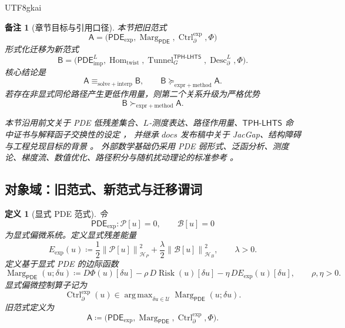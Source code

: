 \documentclass[12pt]{article}
\newtheorem{definition}{定义}[section]
\newtheorem{remark}{备注}[section]
\newcommand{\DefEq}{\coloneqq}
\newcommand{\Pcal}{\mathcal P}
\newcommand{\Bcal}{\mathcal B}
\newcommand{\Ucal}{\mathcal U}
\newcommand{\Hcal}{\mathcal H}
\newcommand{\TPHLHTS}{\ensuremath{\mathsf{TPH\mbox{-}LHTS}}}
\newcommand{\PDE}{\ensuremath{\mathsf{PDE}}}
\newcommand{\norm}[1]{\left\lVert #1 \right\rVert}
\DeclareMathOperator{\Risk}{Risk}
\DeclareMathOperator{\Tunnel}{Tunnel}
\DeclareMathOperator{\Marg}{Marg}
\DeclareMathOperator{\Ctrl}{Ctrl}
\DeclareMathOperator{\Desc}{Desc}
\DeclareMathOperator{\Hom}{Hom}
\DeclareMathOperator*{\argmax}{arg\,max}
\begin{document}
\begin{CJK*}{UTF8}{gkai}
\begin{remark}[章节目标与引用口径]
本节把旧范式
\[
  \mathsf{A}
  =
  \bigl(
  \PDE_{\mathrm{exp}},
  \Marg_{\PDE},
  \Ctrl_{\partial}^{\mathrm{exp}},
  \Phi
  \bigr)
\]
形式化迁移为新范式
\[
  \mathsf{B}
  =
  \bigl(
  \PDE_{\mathrm{imp}}^L,
  \Hom_{\mathrm{twist}},
  \Tunnel_G^{\TPHLHTS},
  \Desc_{\partial}^{L},
  \Phi
  \bigr).
\]
核心结论是
\[
  \boxed{
  \mathsf{A}
  \equiv_{\mathrm{solve+interp}}
  \mathsf{B},
  \qquad
  \mathsf{B}
  \succcurlyeq_{\mathrm{expr+method}}
  \mathsf{A}.
  }
\]
若存在非显式同伦路径产生更低作用量，则第二个关系升级为严格优势
\[
  \mathsf{B}
  \succ_{\mathrm{expr+method}}
  \mathsf{A}.
\]

本节沿用前文关于 PDE 低残差集合、\(L\)-测度表达、路径作用量、\TPHLHTS{} 命中证书与解释函子交换性的设定
\cite{RepoTex55PDEParadigm,RepoTex53StrategyCluster,RepoTex56LHTS,RepoTex57TPHLHTS}，
并继承 \(docs\) 发布稿中关于 JacGap、结构障碍与工程兑现目标的背景
\cite{RepoAppMathVol1,RepoEconomicsVol}。
外部数学基础仍采用 PDE 弱形式、泛函分析、测度论、梯度流、数值优化、路径积分与随机扰动理论的标准参考
\cite{Evans2010PDE,Brezis2011FunctionalAnalysis,Bogachev2007MeasureTheory,
AmbrosioGigliSavare2008GradientFlows,NocedalWright2006NumericalOptimization,
FeynmanHibbs1965PathIntegrals,FreidlinWentzell2012RandomPerturbations}。
\end{remark}

\subsection{对象域：旧范式、新范式与迁移谓词}
\label{subsec:tex58-paradigm-objects}

\begin{definition}[显式 PDE 范式]
\label{def:tex58-explicit-pde-paradigm}
令
\[
  \PDE_{\mathrm{exp}}
  :
  \Pcal[u]=0,
  \qquad
  \Bcal[u]=0
\]
为显式偏微系统。定义显式残差能量
\[
  E_{\mathrm{exp}}(u)
  \DefEq
  \frac12\norm{\Pcal[u]}_{\Hcal_P}^{2}
  +
  \frac{\lambda}{2}\norm{\Bcal[u]}_{\Hcal_B}^{2},
  \qquad
  \lambda>0.
\]
定义基于显式 PDE 的边际函数
\[
  \Marg_{\PDE}(u;\delta u)
  \DefEq
  D\Phi(u)[\delta u]
  -
  \rho\,D\Risk(u)[\delta u]
  -
  \eta\,DE_{\mathrm{exp}}(u)[\delta u],
  \qquad
  \rho,\eta>0.
\]
显式偏微控制算子记为
\[
  \Ctrl_{\partial}^{\mathrm{exp}}(u)
  \in
  \argmax_{\delta u\in\Ucal}
  \Marg_{\PDE}(u;\delta u).
\]
旧范式定义为
\[
  \mathsf{A}
  \DefEq
  \bigl(
  \PDE_{\mathrm{exp}},
  \Marg_{\PDE},
  \Ctrl_{\partial}^{\mathrm{exp}},
  \Phi
  \bigr).
\]
\end{definition}


\end{CJK*}
\end{document}
